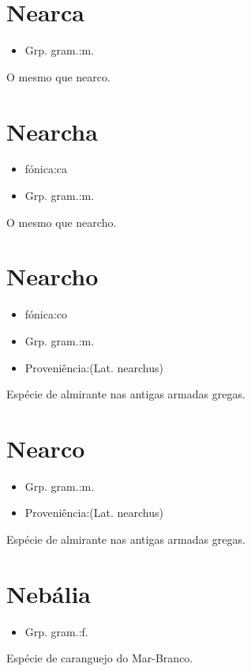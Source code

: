 \section{Nearca}
\begin{itemize}
\item {Grp. gram.:m.}
\end{itemize}
O mesmo que \textunderscore nearco\textunderscore .
\section{Nearcha}
\begin{itemize}
\item {fónica:ca}
\end{itemize}
\begin{itemize}
\item {Grp. gram.:m.}
\end{itemize}
O mesmo que \textunderscore nearcho\textunderscore .
\section{Nearcho}
\begin{itemize}
\item {fónica:co}
\end{itemize}
\begin{itemize}
\item {Grp. gram.:m.}
\end{itemize}
\begin{itemize}
\item {Proveniência:(Lat. \textunderscore nearchus\textunderscore )}
\end{itemize}
Espécie de almirante nas antigas armadas gregas.
\section{Nearco}
\begin{itemize}
\item {Grp. gram.:m.}
\end{itemize}
\begin{itemize}
\item {Proveniência:(Lat. \textunderscore nearchus\textunderscore )}
\end{itemize}
Espécie de almirante nas antigas armadas gregas.
\section{Nebália}
\begin{itemize}
\item {Grp. gram.:f.}
\end{itemize}
Espécie de caranguejo do Mar-Branco.
